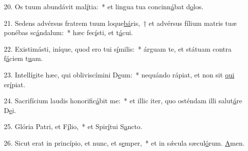 20. Os tuum abundávit mal\uline{í}tia:~* et lingua tua concinn\uline{á}bat d\uline{o}los.\par 
21. Sedens advérsus fratrem tuum loque\uline{bá}ris,~† et advérsus fílium matris tuæ ponébas sc\uline{á}ndalum:~* hæc fec\uline{í}sti, et t\uline{á}cui.\par 
22. Existimásti, iníque, quod ero tui s\uline{í}milis:~* árguam te, et státuam contra f\uline{á}ciem t\uline{u}am.\par 
23. Intellígite hæc, qui obliviscímini D\uline{e}um:~* nequándo rápiat, et non sit \uline{qui} er\uline{í}piat.\par 
24. Sacrifícium laudis honorific\uline{á}bit me:~* et illic iter, quo osténdam illi salut\uline{á}re D\uline{e}i.\par 
25. Glória Patri, et F\uline{í}lio,~* et Spir\uline{í}tui S\uline{a}ncto.\par 
26. Sicut erat in princípio, et nunc, et s\uline{e}mper,~* et in sǽcula sæcul\uline{ó}rum. \uline{A}men.\par 
